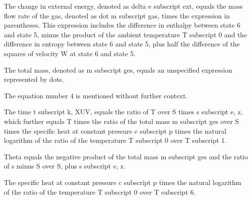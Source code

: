 The change in external energy, denoted as delta e subscript ext, equals the mass flow rate of the gas, denoted as dot m subscript gas, times the expression in parentheses. This expression includes the difference in enthalpy between state 6 and state 5, minus the product of the ambient temperature T subscript 0 and the difference in entropy between state 6 and state 5, plus half the difference of the squares of velocity W at state 6 and state 5.

The total mass, denoted as m subscript ges, equals an unspecified expression represented by dots.

The equation number 4 is mentioned without further context.

The time t subscript k, XUV, equals the ratio of T over S times s subscript e, z, which further equals T times the ratio of the total mass m subscript ges over S times the specific heat at constant pressure c subscript p times the natural logarithm of the ratio of the temperature T subscript 0 over T subscript 1.

Theta equals the negative product of the total mass m subscript ges and the ratio of s minus S over S, plus s subscript e, z.

The specific heat at constant pressure c subscript p times the natural logarithm of the ratio of the temperature T subscript 0 over T subscript 6.